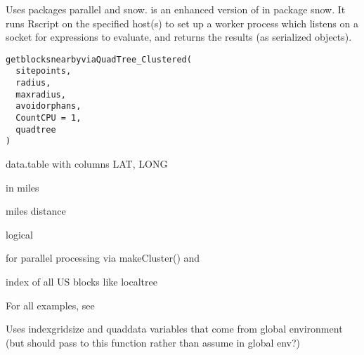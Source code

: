 \documentclass[a4paper]{book}
\begin{document}
%
\begin{Description}\relax
Uses packages parallel and snow.  is an enhanced version of  in package snow.
It runs Rscript on the specified host(s) to set up a worker process which listens on a socket for expressions to evaluate, and returns the results (as serialized objects).
\end{Description}
%
\begin{Usage}
\begin{verbatim}
getblocksnearbyviaQuadTree_Clustered(
  sitepoints,
  radius,
  maxradius,
  avoidorphans,
  CountCPU = 1,
  quadtree
)
\end{verbatim}
\end{Usage}
%
\begin{Arguments}
\begin{ldescription}
\item[\code{sitepoints}] data.table with columns LAT, LONG

\item[\code{radius}] in miles

\item[\code{maxradius}] miles distance

\item[\code{avoidorphans}] logical

\item[\code{CountCPU}] for parallel processing via makeCluster() and 

\item[\code{quadtree}] index of all US blocks like localtree
\end{ldescription}
\end{Arguments}
%
\begin{Details}\relax
For all examples, see 

Uses indexgridsize and quaddata  variables that come from global environment (but should pass to this function rather than assume in global env?)
\end{Details}
%
\begin{SeeAlso}\relax
{}   
\end{SeeAlso}
\end{document}
